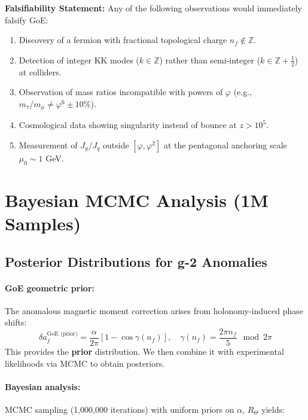 \documentclass[12pt]{article}
\theoremstyle{definition}
\theoremstyle{plain}
\begin{document}
\textbf{Falsifiability Statement:} Any of the following observations would immediately falsify GoE:
\begin{enumerate}
\item Discovery of a fermion with fractional topological charge $n_f \notin \mathbb{Z}$.
\item Detection of integer KK modes ($k \in \mathbb{Z}$) rather than semi-integer ($k \in \mathbb{Z} + \tfrac{1}{2}$) at colliders.
\item Observation of mass ratios incompatible with powers of $\varphi$ (e.g., $m_\tau / m_\mu \neq \varphi^6 \pm 10\%$).
\item Cosmological data showing singularity instead of bounce at $z > 10^5$.
\item Measurement of $J_g/J_q$ outside $[\varphi, \varphi^2]$ at the pentagonal anchoring scale $\mu_0 \sim 1$ GeV.
\end{enumerate}

\section{Bayesian MCMC Analysis (1M Samples)}

\subsection{Posterior Distributions for g-2 Anomalies}

\paragraph{GoE geometric prior:} The anomalous magnetic moment correction arises from holonomy-induced phase shifts:
\begin{equation}
\delta a_f^{\text{GoE (prior)}} = \frac{\alpha}{2\pi} \left[1 - \cos\gamma(n_f)\right], \quad \gamma(n_f) = \frac{2\pi n_f}{5} \mod 2\pi
\end{equation}
This provides the \textbf{prior} distribution. We then combine it with experimental likelihoods via MCMC to obtain posteriors.

\paragraph{Bayesian analysis:} MCMC sampling (1,000,000 iterations) with uniform priors on $\alpha$, $R_\Theta$ yields:
\end{document}
